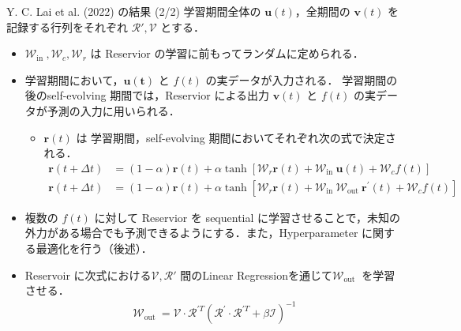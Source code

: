 \begin{frame}{Y. C. Lai et al. (2022) の結果 (2/2)}
    学習期間全体の $\mathbf{u}(t)$，全期間の $\mathbf{v}(t)$ を記録する行列をそれぞれ $\mathcal{R'}, \mathcal{V}$ とする．
    \begin{itemize}
        \item $\mathcal{W}_{\text {in }}, \mathcal{W}_c, \mathcal{W}_r$ は Reservior の学習に前もってランダムに定められる．
        \item 学習期間において，$\mathbf{u(t)}$ と $f(t)$ の実データが入力される．
        学習期間の後のself-evolving 期間では，Reservior による出力 $\mathbf{v}(t)$ と $f(t)$ の実データが予測の入力に用いられる．
        \begin{itemize}
            \item $\mathbf{r}(t)$ は 学習期間，self-evolving 期間においてそれぞれ次の式で決定される．
            \vspace{-.2cm}
            \begin{align}
                \mathbf{r}(t+\Delta t) & =(1-\alpha) \mathbf{r}(t) + \alpha \tanh \left[\mathcal{W}_r \mathbf{r}(t)+\mathcal{W}_{\text {in }} \mathbf{u}(t)+\mathcal{W}_c f(t)\right] \label{Lai_r1}\\
                \mathbf{r}(t+\Delta t) & =(1-\alpha) \mathbf{r}(t) + \alpha \tanh \left[\mathcal{W}_r \mathbf{r}(t)+\mathcal{W}_{\text {in }} \mathcal{W}_{\text {out }} \mathbf{r}^{\prime}(t)+\mathcal{W}_c f(t)\right]\label{Lai_r2}
            \end{align}
        \end{itemize}
        \item 複数の $f(t)$ に対して Reservior を sequential に学習させることで，未知の外力がある場合でも予測できるようにする．また，Hyperparameter に関する最適化を行う（後述）．
        \item Reservoir に次式における$\mathcal{V}, \mathcal{R'}$ 間のLinear Regressionを通じて$\mathcal{W}_{\text {out }}$ を学習させる．
        \vspace{-.2cm}
        \begin{align}
            \mathcal{W}_{\text {out }}=\mathcal{V} \cdot \mathcal{R}^{\prime T}\left(\mathcal{R}^{\prime} \cdot \mathcal{R}^{\prime T}+\beta \mathcal{I}\right)^{-1}
        \end{align}
    \end{itemize}

\end{frame}


